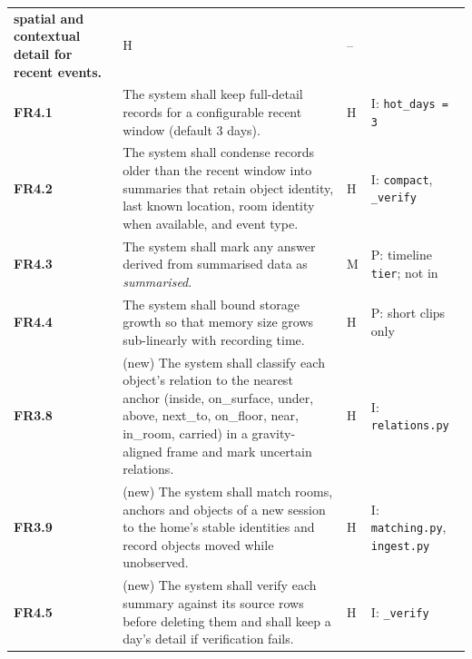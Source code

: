 \begin{ltab}
\begin{longtable}{@{}>{\bfseries}L{1.2cm}L{9.6cm}L{0.8cm}L{3.0cm}@{}}
spatial and contextual detail for recent events. & H & --\\
FR4.1 & The system shall keep full-detail records for a configurable recent
window (default 3 days). & H & I: \texttt{hot\_days = 3}\\
FR4.2 & The system shall condense records older than the recent window into
summaries that retain object identity, last known location, room identity when
available, and event type. & H & I: \texttt{compact}, \texttt{\_verify}\\
FR4.3 & The system shall mark any answer derived from summarised data as
\emph{summarised}. & M & P: timeline \texttt{tier}; not in \\
FR4.4 & The system shall bound storage growth so that memory size grows
sub-linearly with recording time. & H & P: short clips only\\
FR3.8 & (new) The system shall classify each object's relation to the nearest anchor (inside, on\_surface, under, above, next\_to, on\_floor, near, in\_room, carried) in a gravity-aligned frame and mark uncertain relations. & H & I: \texttt{relations.py}\\
FR3.9 & (new) The system shall match rooms, anchors and objects of a new session to the home's stable identities and record objects moved while unobserved. & H & I: \texttt{matching.py}, \texttt{ingest.py}\\
FR4.5 & (new) The system shall verify each summary against its source rows before deleting them and shall keep a day's detail if verification fails. & H & I: \texttt{\_verify}\\
\end{longtable}
\end{ltab}

